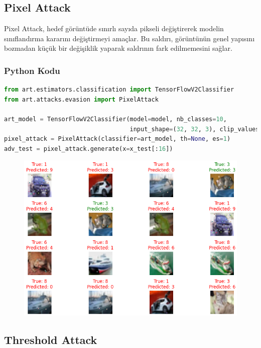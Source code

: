 \newpage

\subsection{Pixel Attack}

Pixel Attack, hedef görüntüde sınırlı sayıda pikseli değiştirerek modelin sınıflandırma kararını değiştirmeyi amaçlar. Bu saldırı, görüntünün genel yapısını bozmadan küçük bir değişiklik yaparak saldrının fark edilmemesini sağlar.

\subsubsection{Python Kodu}

\begin{lstlisting}[language=Python]
from art.estimators.classification import TensorFlowV2Classifier
from art.attacks.evasion import PixelAttack

art_model = TensorFlowV2Classifier(model=model, nb_classes=10, 
                                   input_shape=(32, 32, 3), clip_values=(0, 1))
pixel_attack = PixelAttack(classifier=art_model, th=None, es=1)
adv_test = pixel_attack.generate(x=x_test[:16])
\end{lstlisting}

\begin{figure}[h]
    \centering
    \includegraphics[width=1\textwidth]{images/pixel_attack_results.png}
    \caption{}
\end{figure}

\newpage

\subsection{Threshold Attack}

